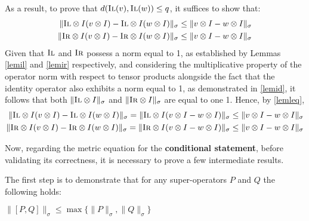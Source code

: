 As a result, to prove that $d(\textsc{Il}(v),\textsc{Il} (w)) \leq q$, it suffices to show that:
\begin{align}
  \lVert \textsc{Il}\otimes I (v \otimes I)-\textsc{Il} \otimes I (w \otimes I)\rVert_{\sigma} \leq \lVert v \otimes I - w \otimes I \rVert_{\sigma} \\
  \lVert \textsc{Ir}\otimes I (v \otimes I)-\textsc{Ir} \otimes I (w \otimes I)\rVert_{\sigma} \leq \lVert v \otimes I - w \otimes I \rVert_{\sigma} 
\end{align}
Given that $\textsc{Il}$ and $\textsc{Ir}$ possess a norm equal to 1, as established by Lemmas \ref{lemil} and \ref{lemir} respectively, and considering the multiplicative property of the operator norm with respect to tensor products alongside the fact that the identity operator also exhibits a norm equal to 1, as demonstrated in  \autoref{lemid}, it follows that both $\lVert \textsc{Il} \otimes I \rVert_{\sigma}$ and $\lVert \textsc{Ir} \otimes I \rVert_{\sigma}$ are equal to one 1. Hence, by \autoref{lemleq},
\begin{align}
   \lVert \textsc{Il}\otimes I (v \otimes I)-\textsc{Il} \otimes I (w \otimes I)\rVert_{\sigma}=\lVert \textsc{Il}\otimes I (v \otimes I-w \otimes I)\rVert_{\sigma} \leq \lVert v \otimes I - w \otimes I \rVert_{\sigma} \\
   \lVert \textsc{Ir}\otimes I (v \otimes I)-\textsc{Ir} \otimes I (w \otimes I)\rVert_{\sigma}=\lVert \textsc{Ir}\otimes I (v \otimes I-w \otimes I)\rVert_{\sigma} \leq \lVert v \otimes I - w \otimes I \rVert_{\sigma}
\end{align}

\vspace{10pt}

Now, regarding the metric equation for the \textbf{conditional statement}, before validating its correctness, it is necessary to prove a few intermediate results. 

The first step is to demonstrate that for any super-operators $P$ and $Q$ the following holds:
\begin{lemma}\label{lem1}
  $\lVert [P,Q] \rVert_{\sigma} \leq \max \{ \lVert P \rVert_{\sigma}, \lVert Q \rVert_{\sigma} \}$
\end{lemma}




